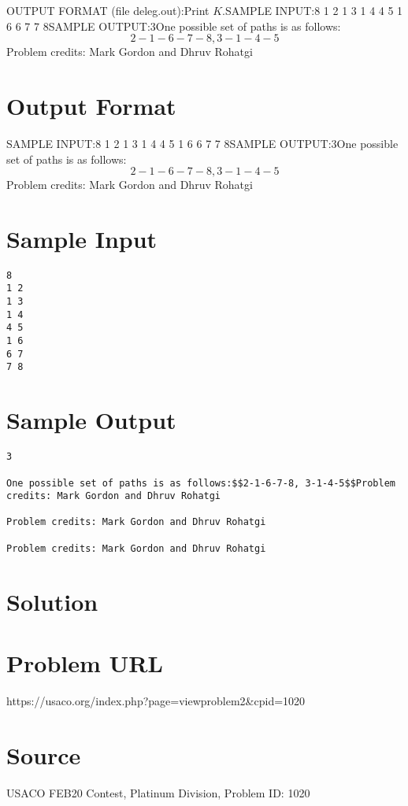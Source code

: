 \documentclass[12pt]{article}
\begin{document}
OUTPUT FORMAT (file deleg.out):Print $K$.SAMPLE INPUT:8
1 2
1 3
1 4
4 5
1 6
6 7
7 8SAMPLE OUTPUT:3One possible set of paths is as follows:$$2-1-6-7-8, 3-1-4-5$$Problem credits: Mark Gordon and Dhruv Rohatgi

\section*{Output Format}
SAMPLE INPUT:8
1 2
1 3
1 4
4 5
1 6
6 7
7 8SAMPLE OUTPUT:3One possible set of paths is as follows:$$2-1-6-7-8, 3-1-4-5$$Problem credits: Mark Gordon and Dhruv Rohatgi

\section*{Sample Input}
\begin{verbatim}
8
1 2
1 3
1 4
4 5
1 6
6 7
7 8
\end{verbatim}

\section*{Sample Output}
\begin{verbatim}
3

One possible set of paths is as follows:$$2-1-6-7-8, 3-1-4-5$$Problem credits: Mark Gordon and Dhruv Rohatgi

Problem credits: Mark Gordon and Dhruv Rohatgi

Problem credits: Mark Gordon and Dhruv Rohatgi
\end{verbatim}

\section*{Solution}


\section*{Problem URL}
https://usaco.org/index.php?page=viewproblem2&cpid=1020

\section*{Source}
USACO FEB20 Contest, Platinum Division, Problem ID: 1020
\end{document}

